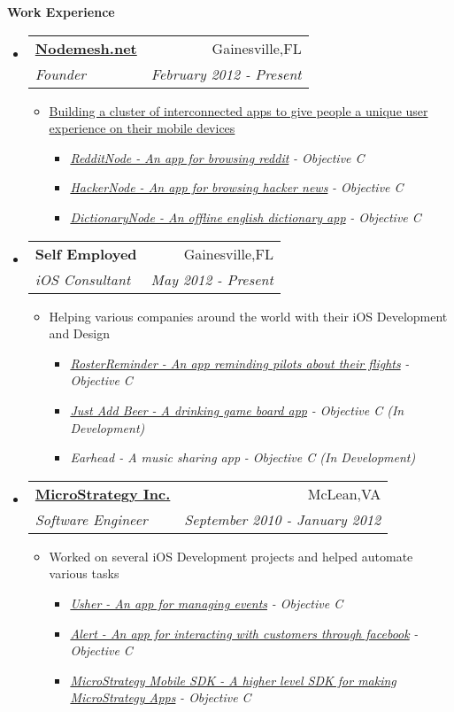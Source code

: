 \documentclass[letterpaper,11pt]{article}
\makeatletter
\newcommand{\resitem}[1]{\item #1 \vspace{-2pt}}
\newcommand{\resheading}[1]{{\large \colorbox{mygrey}{\begin{minipage}{\textwidth}{\textbf{#1 \vphantom{p\^{E}}}}\end{minipage}}}}
\newcommand{\ressubheading}[4]{
\begin{tabular*}{7.0in}{l@{\extracolsep{\fill}}r}
		\textbf{#1} & #2 \\
		\textit{#3} & \textit{#4} \\
\end{tabular*}\vspace{-6pt}}
\makeatother
\begin{document}
\resheading{Work Experience}
\begin{itemize}

\item
    \ressubheading{\href{http://www.nodemesh.net}{Nodemesh.net}}{Gainesville,FL}{Founder}{February 2012 - Present}
    \begin{itemize}
        \resitem{\href{http://www.nodemesh.net}{Building a cluster of interconnected apps to give people a unique user experience on their mobile devices}}
        \begin{itemize}
           \resitem{\href{http://www.nodemesh.net/redditnode}{\emph{RedditNode - An app for browsing reddit}}\emph{ - Objective C}}
            \resitem{\href{http://www.nodemesh.net/hackernode}{\emph{HackerNode - An app for browsing hacker news}}\emph{ - Objective C}}
            \resitem{\href{http://www.nodemesh.net/dictionarynode}{\emph{DictionaryNode - An offline english dictionary app}}\emph{ - Objective C}}
        \end{itemize}
    \end{itemize}

\item
    \ressubheading{{Self Employed}}{Gainesville,FL}{iOS Consultant}{May 2012 - Present}
    \begin{itemize}
        \resitem{Helping various companies around the world with their iOS Development and Design}
        \begin{itemize}
           \resitem{\href{http://apphqx.com}{\emph{RosterReminder - An app reminding pilots about their flights}}\emph{ - Objective C}}
            \resitem{\href{http://drinktwo.com}{\emph{Just Add Beer - A drinking game board app}}\emph{ - Objective C (In Development)}}
            \resitem{\emph{Earhead - A music sharing app}\emph{ - Objective C (In Development)}}
        \end{itemize}
    \end{itemize}
  
\item
    \ressubheading{\href{http://www.microstrategy.com/Company}{MicroStrategy Inc.}}{McLean,VA}{Software Engineer}{September 2010 - January 2012}
    \begin{itemize}
        \resitem{Worked on several iOS Development projects and helped automate various tasks}
        \begin{itemize}
            \resitem{\href{http://itunes.apple.com/us/app/usher-by-microstrategy/id477543403}{\emph{Usher - An app for managing events}}\emph{ - Objective C}}
             \resitem{\href{http://itunes.apple.com/us/app/alert-for-iphone/id442981988?mt=8&ls=1}{\emph{Alert - An app for interacting with customers through facebook}}\emph{ - Objective C}}
               \resitem{ \href{http://www.microstrategy.com/mobile/}{\emph{MicroStrategy Mobile SDK - A higher level SDK for making MicroStrategy Apps}}\emph{ - Objective C}}
        \end{itemize}
    \end{itemize}


\end{itemize}
\end{document}
